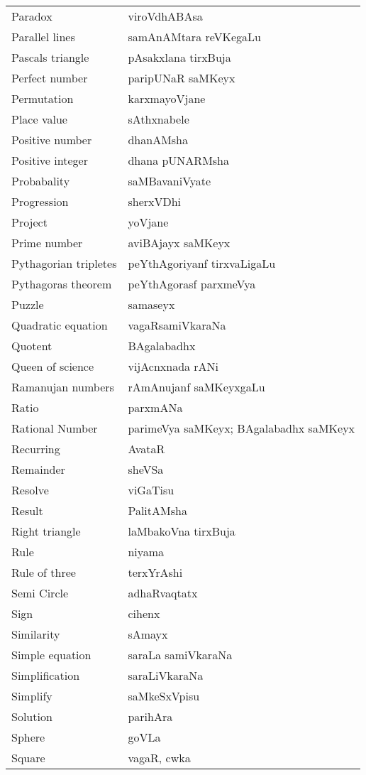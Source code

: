 {\begin{longtable}{>{\rm}l@{\hspace{1cm}}l}
Paradox & viroVdhABAsa\\
Parallel lines & samAnAMtara reVKegaLu\\
Pascals triangle & pAsakxlana tirxBuja\\
Perfect number & paripUNaR saMKeyx\\
Permutation & karxmayoVjane\\
Place value & sAthxnabele\\
Positive number & dhanAMsha\\
Positive integer & dhana pUNARMsha\\
Probabality & saMBavaniVyate\\
Progression & sherxVDhi\\
Project & yoVjane\\
Prime number & aviBAjayx saMKeyx\\
Pythagorian tripletes & peYthAgoriyanf tirxvaLigaLu\\
Pythagoras theorem & peYthAgorasf parxmeVya\\
Puzzle & samaseyx\\
Quadratic equation & vagaRsamiVkaraNa\\
Quotent & BAgalabadhx\\
Queen of science & vijAcnxnada rANi\\
Ramanujan numbers & rAmAnujanf saMKeyxgaLu\\
Ratio & parxmANa\\
Rational Number & parimeVya saMKeyx; BAgalabadhx saMKeyx\\
Recurring & AvataR\\
Remainder & sheVSa\\
Resolve & viGaTisu\\
Result & PalitAMsha\\
Right triangle & laMbakoVna tirxBuja\\
Rule & niyama\\
Rule of three & terxYrAshi\\
Semi Circle & adhaRvaqtatx\\
Sign & cihenx\\
Similarity & sAmayx\\
Simple equation & saraLa samiVkaraNa\\
Simplification & saraLiVkaraNa\\
Simplify & saMkeSxVpisu\\
Solution & parihAra\\
Sphere & goVLa\\
Square & vagaR, cwka\\

\end{longtable}}
